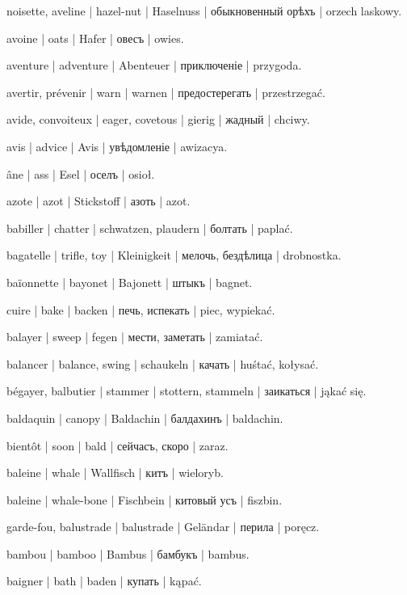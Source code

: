 \begin{outdent}{1em}
noisette, aveline | hazel-nut | Haselnuss | обыкновенный орѣхъ | orzech laskowy.

avoine | oats | Hafer | овесъ | owies.

aventure | adventure | Abenteuer | приключеніе | przygoda.

avertir, prévenir | warn | warnen | предостерегать | przestrzegać.

avide, convoiteux | eager, covetous | gierig | жадный | chciwy.

avis | advice | Avis | увѣдомленіе | awizacya.

âne | ass | Esel | оселъ | osioł.

azote | azot | Stickstoff | азоть | azot.


babiller | chatter | schwatzen, plaudern | болтать | paplać.

bagatelle | trifle, toy | Kleinigkeit | мелочь, бездѣлица | drobnostka.

baïonnette | bayonet | Bajonett | штыкъ | bagnet.

cuire | bake | backen | печь, испекать | piec, wypiekać.

balayer | sweep | fegen | мести, заметать | zamiatać.

balancer | balance, swing | schaukeln | качать | huśtać, kołysać.

bégayer, balbutier | stammer | stottern, stammeln | заикаться | jąkać się.

baldaquin | canopy | Baldachin | балдахинъ | baldachin.

bientôt | soon | bald | сейчасъ, скоро | zaraz.

baleine | whale | Wallfisch | китъ | wieloryb.

\uvsubentry{}
baleine | whale-bone | Fischbein | китовый усъ | fiszbin.

garde-fou, balustrade | balustrade | Geländar | перила | poręcz.

bambou | bamboo | Bambus | бамбукъ | bambus.

baigner | bath | baden | купать | kąpać.


\end{outdent}
